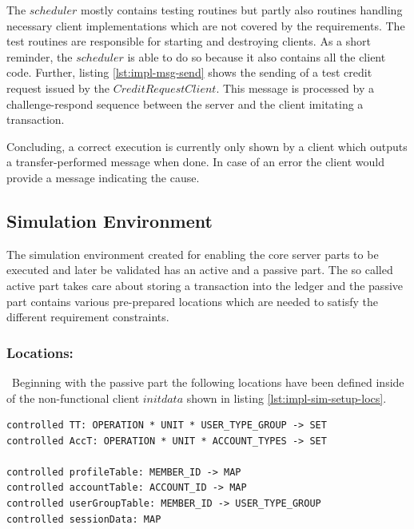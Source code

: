 The $scheduler$ mostly contains testing routines but partly also routines handling necessary client implementations which are not covered by the requirements. The test routines are responsible for starting and destroying clients. As a short reminder, the $scheduler$ is able to do so because it also contains all the client code. Further, listing \ref{lst:impl-msg-send} shows the sending of a test credit request issued by the $CreditRequestClient$. This message is processed by a challenge-respond sequence between the server and the client imitating a transaction.

Concluding, a correct execution is currently only shown by a client which outputs a transfer-performed message when done. In case of an error the client would provide a message indicating the cause.

\subsection{Simulation Environment}
\label{subsec:impl-sim-env}

The simulation environment created for enabling the core server parts to be executed and later be validated has an active and a passive part. The so called active part takes care about storing a transaction into the ledger and the passive part contains various pre-prepared locations which are needed to satisfy the different requirement constraints.

\subsubsection{Locations: }\ Beginning with the passive part the following locations have been defined inside of the non-functional client $initdata$ shown in listing \ref{lst:impl-sim-setup-locs}.

\begin{center}
\begin{minipage}{0.8\textwidth}
\small
\begin{lstlisting}[language=bsl_lst,caption={\bf\small Simulation Environment Locations},label={lst:impl-sim-setup-locs} ]
controlled TT: OPERATION * UNIT * USER_TYPE_GROUP -> SET
controlled AccT: OPERATION * UNIT * ACCOUNT_TYPES -> SET

controlled profileTable: MEMBER_ID -> MAP
controlled accountTable: ACCOUNT_ID -> MAP
controlled userGroupTable: MEMBER_ID -> USER_TYPE_GROUP
controlled sessionData: MAP
\end{lstlisting}
\end{minipage}
\end{center}

